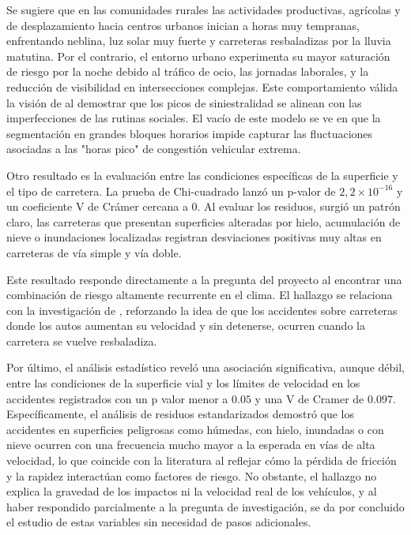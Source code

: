 \documentclass[12pt]{article}
\begin{document}
 Se sugiere que en las comunidades rurales las actividades productivas, agrícolas y de desplazamiento hacia centros urbanos inician a horas muy tempranas, enfrentando neblina, luz solar muy fuerte y carreteras resbaladizas por la lluvia matutina. Por el contrario, el entorno urbano experimenta su mayor saturación de riesgo por la noche debido al tráfico de ocio, las jornadas laborales, y la reducción de visibilidad en intersecciones complejas. Este comportamiento válida la visión de \textcite{HOSSEINIAN2012} al demostrar que los picos de siniestralidad se alinean con las imperfecciones de las rutinas sociales. El vacío de este modelo se ve en que la segmentación en grandes bloques horarios impide capturar las fluctuaciones asociadas a las "horas pico" de congestión vehicular extrema.

 Otro resultado es la evaluación entre las condiciones específicas de la superficie y el tipo de carretera. La prueba de Chi-cuadrado lanzó un p-valor de $2,2 \times 10^{-16}$ y un coeficiente V de Crámer cercana a 0. Al evaluar los residuos, surgió un patrón claro, las carreteras que presentan superficies alteradas por hielo, acumulación de nieve o inundaciones localizadas registran desviaciones positivas muy altas en carreteras de vía simple y vía doble.

 Este resultado responde directamente a la pregunta del proyecto al encontrar una combinación de riesgo altamente recurrente en el clima. El hallazgo se relaciona con la investigación de \textcite{KARZAN2017}, reforzando la idea de que los accidentes sobre carreteras donde los autos aumentan su velocidad y sin detenerse, ocurren cuando la carretera se vuelve resbaladiza. 

 Por último, el análisis estadístico reveló una asociación significativa, aunque débil, entre las condiciones de la superficie vial y los límites de velocidad en los accidentes registrados con un p valor menor a $ 0.05$ y una V de Cramer de $0.097$. Específicamente, el análisis de residuos estandarizados demostró que los accidentes en superficies peligrosas como húmedas, con hielo, inundadas o con nieve ocurren con una frecuencia mucho mayor a la esperada en vías de alta velocidad, lo que coincide con la literatura al reflejar cómo la pérdida de fricción y la rapidez interactúan como factores de riesgo. No obstante, el hallazgo no explica la gravedad de los impactos ni la velocidad real de los vehículos, y al haber respondido parcialmente a la pregunta de investigación, se da por concluido el estudio de estas variables sin necesidad de pasos adicionales.
\end{document}
